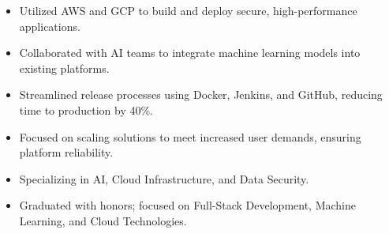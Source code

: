 \par\smallskip
\noindent
\begin{minipage}{20cm}
  \begin{minipage}{9.75cm}
    \begin{itemize}
      \item Utilized AWS and GCP to build and deploy secure, high-performance applications.
      \item Collaborated with AI teams to integrate machine learning models into existing platforms.
    \end{itemize}
  \end{minipage}
  \hfill
  \begin{minipage}{9.75cm}
    \begin{itemize}
      \item Streamlined release processes using Docker, Jenkins, and GitHub, reducing time to production by 40\%.
      \item Focused on scaling solutions to meet increased user demands, ensuring platform reliability.
    \end{itemize}
  \end{minipage}
\end{minipage}
\par\smallskip
\divider

\begin{itemize}
  \item Specializing in AI, Cloud Infrastructure, and Data Security.
\end{itemize}
\divider

\begin{itemize}
  \item Graduated with honors; focused on Full-Stack Development, Machine Learning, and Cloud Technologies.
\end{itemize}

\noindent
\begin{minipage}{20cm}
\end{minipage}


